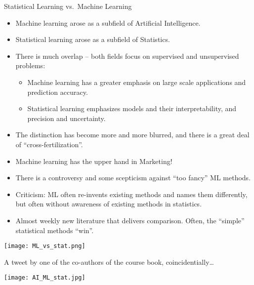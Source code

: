 \documentclass[ignorenonframetext,]{beamer}
\providecommand{\tightlist}{%
  \setlength{\itemsep}{0pt}\setlength{\parskip}{0pt}}
\begin{document}
\begin{frame}{Statistical Learning vs.~Machine Learning}
\protect\hypertarget{statistical-learning-vs.machine-learning}{}

\begin{itemize}
\item
  Machine learning arose as a subfield of Artificial Intelligence.
\item
  Statistical learning arose as a subfield of Statistics.
\item
  There is much overlap -- both fields focus on supervised and
  unsupervised problems:

  \begin{itemize}
  \tightlist
  \item
    Machine learning has a greater emphasis on large scale applications
    and prediction accuracy.
  \item
    Statistical learning emphasizes models and their interpretability,
    and precision and uncertainty.
  \end{itemize}
\item
  The distinction has become more and more blurred, and there is a great
  deal of ``cross-fertilization''.
\item
  Machine learning has the upper hand in Marketing!
\end{itemize}

\end{frame}

\begin{frame}

\begin{itemize}
\item
  There is a controversy and some scepticism against ``too fancy'' ML
  methods.
\item
  Criticism: ML often re-invents existing methods and names them
  differently, but often without awareness of existing methods in
  statistics.
\item
  Almost weekly new literature that delivers comparison. Often, the
  ``simple'' statistical methods ``win''.
\end{itemize}

\texttt{[image: ML\_vs\_stat.png]}

\end{frame}

\begin{frame}

A tweet by one of the co-authors of the course book,
coincidentially\ldots{}

\texttt{[image: AI\_ML\_stat.jpg]}

\end{frame}
\end{document}

